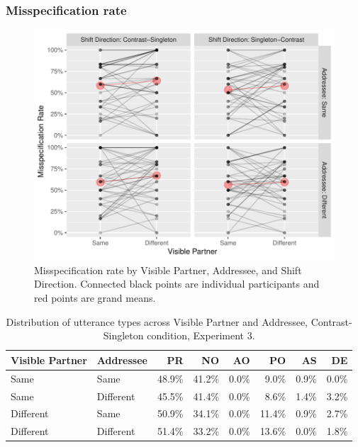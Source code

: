 \documentclass[natbib,doc,a4paper]{apa6}
\begin{document}
\subsubsection*{Misspecification rate}
\label{sec:orgc59c51b}

\begin{figure}[htbp]
\centering
\includegraphics[width=.9\linewidth]{exp3/img/exp3-misrate-plot.pdf}
\caption{\label{fig:org16acd48}
Misspecification rate by Visible Partner, Addressee, and Shift Direction. Connected black points are individual participants and red points are grand means.}
\end{figure}

\begin{table}[ht]
\centering
\caption{Distribution of utterance types across Visible Partner and Addressee, Contrast-Singleton condition, Experiment 3.} 
\label{tbl:exp3-utt-dist}
\begin{tabular}{llrrrrrr}
  \hline
Visible Partner & Addressee & PR & NO & AO & PO & AS & DE \\ 
  \hline
Same & Same & 48.9\% & 41.2\% & 0.0\% & 9.0\% & 0.9\% & 0.0\% \\ 
  Same & Different & 45.5\% & 41.4\% & 0.0\% & 8.6\% & 1.4\% & 3.2\% \\ 
  Different & Same & 50.9\% & 34.1\% & 0.0\% & 11.4\% & 0.9\% & 2.7\% \\ 
  Different & Different & 51.4\% & 33.2\% & 0.0\% & 13.6\% & 0.0\% & 1.8\% \\ 
   \hline
\end{tabular}
\end{table}
\end{document}

